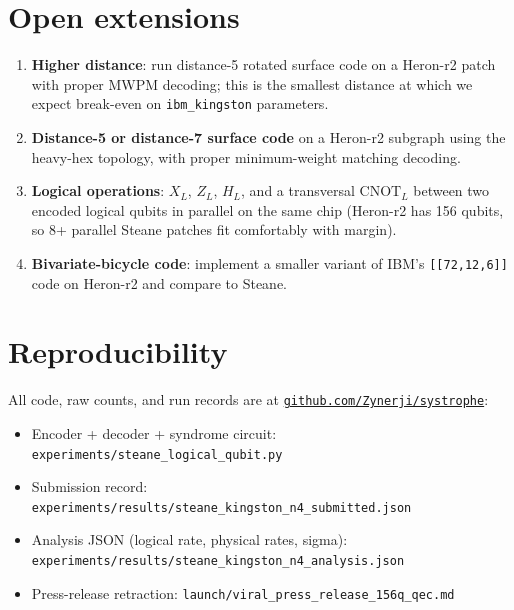 \documentclass[11pt,letterpaper]{article}
\begin{document}
\section{Open extensions}\label{sec:extensions}

\begin{enumerate}[leftmargin=*,itemsep=0pt]
\item \textbf{Higher distance}: run distance-5 rotated surface code on a Heron-r2 patch with proper MWPM decoding; this is the smallest distance at which we expect break-even on \texttt{ibm\_kingston} parameters.
\item \textbf{Distance-5 or distance-7 surface code} on a Heron-r2 subgraph using the heavy-hex topology, with proper minimum-weight matching decoding.
\item \textbf{Logical operations}: $X_L$, $Z_L$, $H_L$, and a transversal $\mathrm{CNOT}_L$ between two encoded logical qubits in parallel on the same chip (Heron-r2 has 156 qubits, so 8+ parallel Steane patches fit comfortably with margin).
\item \textbf{Bivariate-bicycle code}: implement a smaller variant of IBM's \texttt{[[72,12,6]]} code on Heron-r2 and compare to Steane.
\end{enumerate}

\section{Reproducibility}

All code, raw counts, and run records are at \href{https://github.com/Zynerji/systrophe}{\texttt{github.com/Zynerji/systrophe}}:

\begin{itemize}[leftmargin=*,itemsep=0pt]
\item Encoder + decoder + syndrome circuit: \texttt{experiments/steane\_logical\_qubit.py}
\item Submission record: \texttt{experiments/results/steane\_kingston\_n4\_submitted.json}
\item Analysis JSON (logical rate, physical rates, sigma): \texttt{experiments/results/steane\_kingston\_n4\_analysis.json}
\item Press-release retraction: \texttt{launch/viral\_press\_release\_156q\_qec.md}
\end{itemize}
\end{document}
